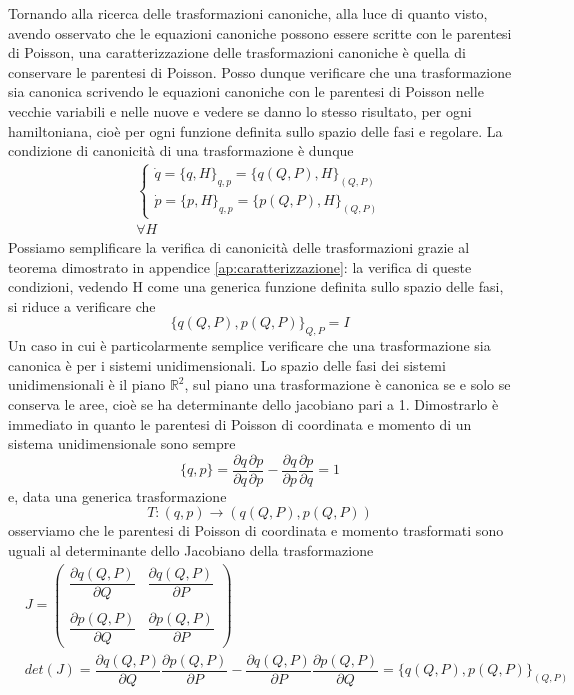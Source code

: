 \documentclass[
10pt, %
a4paper, %
oneside, %
headinclude,footinclude, %
BCOR5mm, %
]{scrartcl}
\begin{document}
Tornando alla ricerca delle trasformazioni canoniche, alla luce di quanto visto, avendo osservato che le equazioni canoniche possono essere scritte con le parentesi di Poisson, una caratterizzazione delle trasformazioni canoniche è quella di conservare le parentesi di Poisson. Posso dunque verificare che una trasformazione sia canonica scrivendo le equazioni canoniche con le parentesi di Poisson nelle vecchie variabili e nelle nuove e vedere se danno lo stesso risultato, per ogni hamiltoniana, cioè per ogni funzione definita sullo spazio delle fasi e regolare. La condizione di canonicità di una trasformazione è dunque
\begin{align*}
	\begin{cases}
		\dot{q} = \{q, H\}_{q, p} = \{q(Q, P), H\}_{(Q, P)}\\
		\dot{p} = \{p, H\}_{q, p} = \{p(Q, P), H\}_{(Q, P)}
	\end{cases}\\
\forall H
\end{align*}
Possiamo semplificare la verifica di canonicità delle trasformazioni grazie al teorema dimostrato in appendice \ref{ap:caratterizzazione}: la verifica di queste condizioni, vedendo H come una generica funzione definita sullo spazio delle fasi, si riduce a verificare che 
\[\{q(Q, P), p(Q, P)\}_{Q, P}=I\]
Un caso in cui è particolarmente semplice verificare che una trasformazione sia canonica è per i sistemi unidimensionali. Lo spazio delle fasi dei sistemi unidimensionali è il piano \(\mathbb{R}^2\), sul piano una trasformazione è canonica se e solo se conserva le aree, cioè se ha determinante dello jacobiano pari a 1. Dimostrarlo è immediato in quanto le parentesi di Poisson di coordinata e momento di un sistema unidimensionale sono sempre
\[\{q, p\} = \frac{\partial q}{\partial q}\frac{\partial p}{\partial p}-\frac{\partial q}{\partial p}\frac{\partial  p}{\partial q}= 1\]
e, data una generica trasformazione 
\[T:(q, p)\rightarrow (q(Q, P), p(Q, P))\]
osserviamo che le parentesi di Poisson di coordinata e momento trasformati sono uguali al determinante dello Jacobiano della trasformazione
\begin{align*}
	&J =
	\begin{pmatrix}
		\dfrac{\partial q(Q, P)}{\partial Q}&\dfrac{\partial q(Q, P)}{\partial P}\\\\
		\dfrac{\partial p(Q, P)}{\partial Q}&\dfrac{\partial p(Q, P)}{\partial P}
	\end{pmatrix}\\
&det(J) = \dfrac{\partial q(Q, P)}{\partial Q}\dfrac{\partial p(Q, P)}{\partial P}
-\dfrac{\partial q(Q, P)}{\partial P}\dfrac{\partial p(Q, P)}{\partial Q} = \{q(Q, P), p(Q, P)\}_{(Q, P)}
\end{align*}
\end{document}
